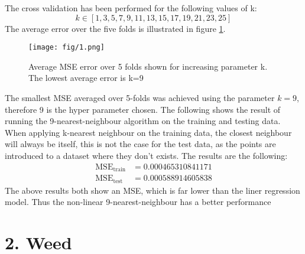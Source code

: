 \documentclass{article}
\begin{document}
The cross validation has been performed for the following values of k:
$$ k \in \left[ 1,3,5,7,9,11,13,15,17,19,21,23,25 \right] $$
The average error over the five folds is illustrated in figure \ref{fig:mulplots}.
\begin{figure}[H]
  \centering
  \texttt{[image: fig/1.png]}
  \caption{Average MSE error over 5 folds shown for increasing parameter k. The lowest average error is k=9}
  \label{fig:mulplots}
\end{figure}
The smallest MSE averaged over 5-folds was achieved using the parameter $k=9$, therefore 9 is the hyper parameter chosen. The following shows the result of running the 9-nearest-neighbour algorithm on the training and testing data. When applying k-nearest neighbour on the training data, the closest neighbour will always be itself, this is not the case for the test data, as the points are introduced to a dataset where they don't exists. The results are the following:
\begin{align*}
\text{MSE}_{\text{train}} &=  0.000465310841171 \\
\text{MSE}_{\text{test}} &=  0.000588914605838
\end{align*}
The above results both show an MSE, which is far lower than the liner regression model. Thus the non-linear 9-nearest-neighbour has a better performance %
\section{2. Weed}
\end{document}
